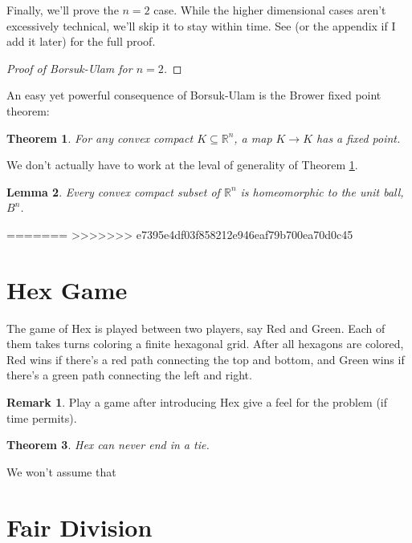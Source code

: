 \documentclass[12pt]{amsart}
\newtheorem{thm}{Theorem}[section]
\newtheorem{lem}[thm]{Lemma}
\theoremstyle{definition}
\newtheorem*{rem}{Remark}
\begin{document}
    Finally, we'll prove the $n=2$ case. While the higher dimensional cases aren't excessively technical, we'll skip it to stay within time. See \cite[ch 2]{topcombi} (or the appendix if I add it later) for the full proof.

    \begin{proof}[Proof of Borsuk-Ulam for $n=2$]

    \end{proof}

    An easy yet powerful consequence of Borsuk-Ulam is the Brower fixed point theorem:
    \begin{thm}
        \label{brower}
        For any convex compact $K \subseteq \mathbb R^n$, a map $K \to K$ has a fixed point.
    \end{thm}

    We don't actually have to work at the leval of generality of Theorem \ref{brower}.

    \begin{lem}
        Every convex compact subset of $\mathbb R^n$ is homeomorphic to the unit ball, $B^n$.
    \end{lem}
    
    \newpage
=======
\newpage
>>>>>>> e7395e4df03f858212e946eaf79b700ea70d0c45

\section{Hex Game}

The game of Hex is played between two players, say Red and Green. Each
of them takes turns coloring a finite hexagonal grid. After all
hexagons are colored, Red wins if there's a red path connecting the
top and bottom, and Green wins if there's a green path connecting the
left and right.

    \begin{rem}
      Play a game after introducing Hex give a feel for the problem
      (if time permits).
    \end{rem}

    \begin{thm}
      Hex can never end in a tie.
    \end{thm}

    We won't assume that



    \newpage

    \section{Fair Division}
\end{document}
